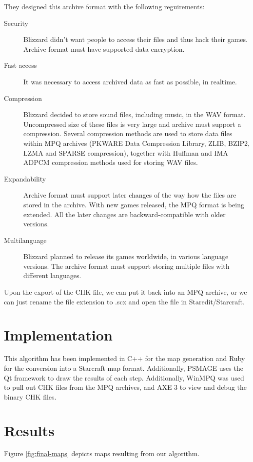 \documentclass[letterpaper]{article}
\begin{document}
They designed this archive format with the following reguirements:
\begin{description}
	\item[Security] Blizzard didn't want people to access their files and thus hack their games. Archive format must have supported data encryption.
	\item[Fast access] It was necessary to access archived data as fast as possible, in realtime.
	\item[Compression] Blizzard decided to store sound files, including music, in the WAV format. Uncompressed size of these files is very large and archive must support a compression. Several compression methods are used to store data files within MPQ archives (PKWARE Data Compression Library, ZLIB, BZIP2, LZMA and SPARSE compression), together with Huffman and IMA ADPCM compression methods used for storing WAV files.
	\item[Expandability] Archive format must support later changes of the way how the files are stored in the archive. With new games released, the MPQ format is being extended. All the later changes are backward-compatible with older versions.
	\item[Multilanguage] Blizzard planned to release its games worldwide, in various language versions. The archive format must support storing multiple files with different languages.
\end{description}

Upon the export of the CHK file, we can put it back into an MPQ archive, or we can just rename the file extension to .scx and open the file in Staredit/Starcraft.



\section{Implementation} %
\label{sec:implementation}
This algorithm has been implemented in C++ for the map generation and Ruby for the conversion into a Starcraft map format. Additionally, PSMAGE uses the Qt framework to draw the results of each step. Additionally, WinMPQ was used to pull out CHK files from the MPQ archives, and AXE 3 to view and debug the binary CHK files.


\section{Results} %
\label{sec:results}
Figure \ref{fig:final-maps} depicts maps resulting from our algorithm.
\end{document}
